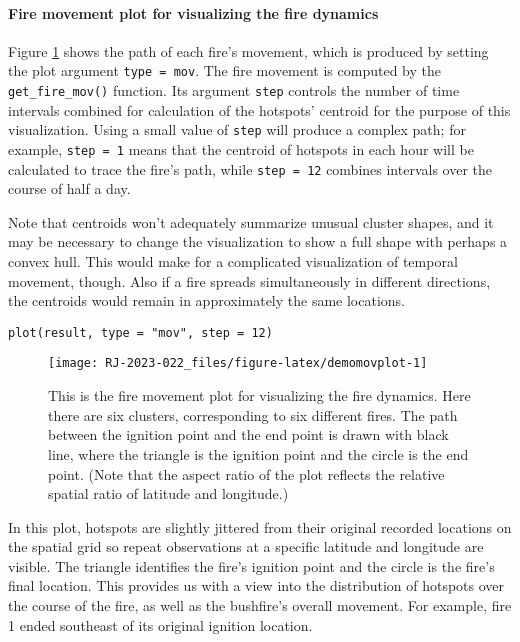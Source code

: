 \hypertarget{fire-movement-plot-for-visualizing-the-fire-dynamics}{%
\paragraph{Fire movement plot for visualizing the fire dynamics}\label{fire-movement-plot-for-visualizing-the-fire-dynamics}}

Figure \ref{fig:demomovplot} shows the path of each fire's movement, which is produced by setting the plot argument \texttt{type\ =\ \textquotesingle{}mov\textquotesingle{}}. The fire movement is computed by the \texttt{get\_fire\_mov()} function. Its argument \texttt{step} controls the number of time intervals combined for calculation of the hotspots' centroid for the purpose of this visualization. Using a small value of \texttt{step} will produce a complex path; for example, \texttt{step\ =\ 1} means that the centroid of hotspots in each hour will be calculated to trace the fire's path, while \texttt{step\ =\ 12} combines intervals over the course of half a day.

Note that centroids won't adequately summarize unusual cluster shapes, and it may be necessary to change the visualization to show a full shape with perhaps a convex hull. This would make for a complicated visualization of temporal movement, though. Also if a fire spreads simultaneously in different directions, the centroids would remain in approximately the same locations.

\begin{verbatim}
plot(result, type = "mov", step = 12)
\end{verbatim}

\begin{figure}

{\centering \texttt{[image: RJ-2023-022\_files/figure-latex/demomovplot-1]} 

}

\caption{This is the fire movement plot for visualizing the fire dynamics. Here there are six clusters, corresponding to six different fires. The path between the ignition point and the end point is drawn with black line, where the triangle is the ignition point and the circle is the end point. (Note that the aspect ratio of the plot reflects the relative spatial ratio of latitude and longitude.)}\label{fig:demomovplot}
\end{figure}

In this plot, hotspots are slightly jittered from their original recorded locations on the spatial grid so repeat observations at a specific latitude and longitude are visible. The triangle identifies the fire's ignition point and the circle is the fire's final location. This provides us with a view into the distribution of hotspots over the course of the fire, as well as the bushfire's overall movement. For example, fire 1 ended southeast of its original ignition location.

